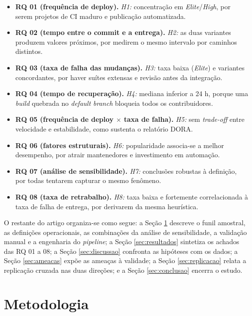 \begin{itemize}
  \item \textbf{RQ 01 (frequência de deploy).} \emph{H1:} concentração em \emph{Elite}/\emph{High}, por serem
    projetos de CI maduro e publicação automatizada.
  \item \textbf{RQ 02 (tempo entre o commit e a entrega).} \emph{H2:} as duas variantes produzem valores próximos, por
    medirem o mesmo intervalo por caminhos distintos.
  \item \textbf{RQ 03 (taxa de falha das mudanças).} \emph{H3:} taxa baixa (\emph{Elite}) e variantes concordantes,
    por haver suítes extensas e revisão antes da integração.
  \item \textbf{RQ 04 (tempo de recuperação).} \emph{H4:} mediana inferior a 24 h, porque uma
    \emph{build} quebrada no \emph{default branch} bloqueia todos os contribuidores.
  \item \textbf{RQ 05 (frequência de deploy $\times$ taxa de falha).} \emph{H5:} sem \emph{trade-off} entre velocidade e
    estabilidade, como sustenta o relatório DORA.
  \item \textbf{RQ 06 (fatores estruturais).} \emph{H6:} popularidade associa-se a melhor desempenho,
    por atrair mantenedores e investimento em automação.
  \item \textbf{RQ 07 (análise de sensibilidade).} \emph{H7:} conclusões robustas à definição, por todas
    tentarem capturar o mesmo fenômeno.
  \item \textbf{RQ 08 (taxa de retrabalho).} \emph{H8:} taxa baixa e fortemente correlacionada à taxa de falha
    de entrega, por derivarem da mesma heurística.
\end{itemize}

O restante do artigo organiza-se como segue: a Seção \ref{sec:metodologia} descreve o funil
amostral, as definições operacionais, as combinações da análise de sensibilidade, a
validação manual e a engenharia do \emph{pipeline}; a Seção \ref{sec:resultados} sintetiza
os achados das RQ 01 a 08; a Seção \ref{sec:discussao} confronta as hipóteses com os dados;
a Seção \ref{sec:ameacas} expõe as ameaças à validade; a Seção \ref{sec:replicacao} relata a
replicação cruzada nas duas direções; e a Seção \ref{sec:conclusao} encerra o estudo.

\section{Metodologia}
\label{sec:metodologia}

